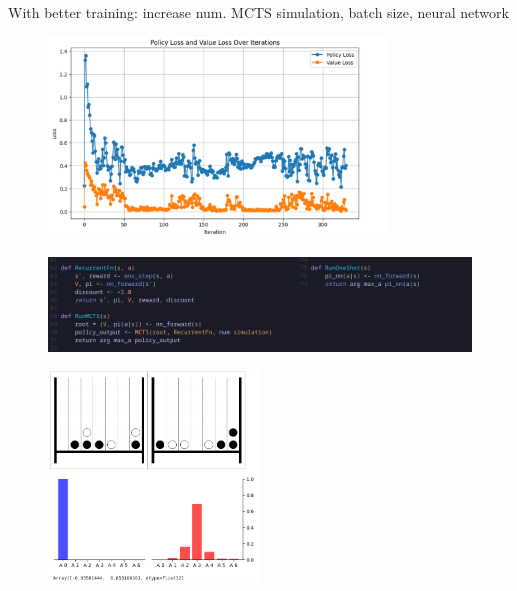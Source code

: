 \documentclass[aspectratio=169,xcolor=dvipsnames]{beamer}
\begin{document}
\begin{frame}{}
With better training: increase num. MCTS simulation, batch size, neural network
\begin{figure}[h]
    \centering
    \includegraphics[width=0.8\textwidth]{alphazero_loss_plot2.png}
    \label{fig:intro}
\end{figure}
\end{frame}

\begin{frame}{}
\begin{figure}[h]
    \centering
    \includegraphics[width=1\textwidth]{inference.png}
    \label{fig:intro}
\end{figure}
\end{frame}

\begin{frame}{}
\begin{figure}[h]
    \centering
    \includegraphics[width=0.5\textwidth]{network_forward.png}
    \label{fig:intro}
\end{figure}
\end{frame}
\end{document}
